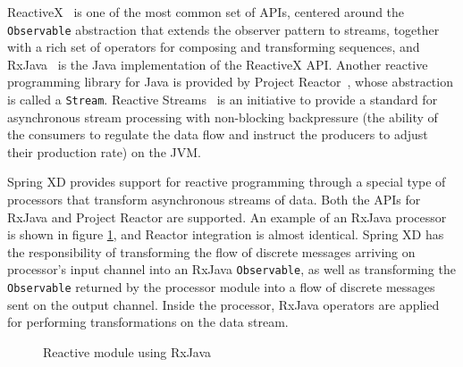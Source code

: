 ReactiveX~\cite{reactivex} is one of the most common set of APIs, centered around
the \texttt{Observable} abstraction that extends the observer pattern to streams,
together with a rich set of operators for composing and transforming sequences, and
RxJava~\cite{rxjava} is the Java implementation of the ReactiveX API. Another
reactive programming library for Java is provided by Project 
Reactor~\cite{reactor}, whose abstraction is called a \texttt{Stream}.
Reactive Streams~\cite{reactivestreams} is an initiative to provide a standard for
asynchronous stream processing with non-blocking backpressure (the ability of the
consumers to regulate the data flow and instruct the producers to adjust their
production rate) on the JVM.

Spring XD provides support for reactive programming \linebreak
through a special type of processors that transform asynchronous
streams of data. Both the APIs for RxJava and Project Reactor are
supported. An example of an RxJava processor is shown in
figure \ref{fig:rxjava}, and Reactor integration is almost identical. Spring XD
has the responsibility of transforming the flow of discrete messages arriving
on processor's input channel into an RxJava \texttt{Observable}, as well as
transforming the \texttt{Observable} returned by the processor module into a
flow of discrete messages sent on the output channel. Inside the processor,
RxJava operators are applied for performing transformations on the data stream.

\begin{figure}[ht]
\centering
{}
\caption{Reactive module using RxJava}
\label{fig:rxjava}
\end{figure}

